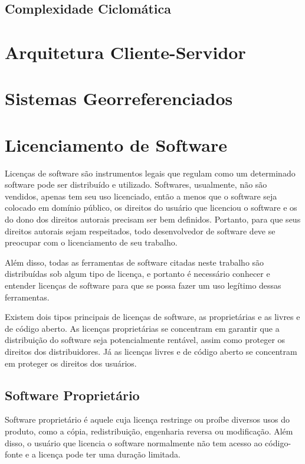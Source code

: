 \subsection{Complexidade Ciclomática}

\section{Arquitetura Cliente-Servidor}

\section{Sistemas Georreferenciados}

\section{Licenciamento de Software}

Licenças de software são instrumentos legais que regulam como um determinado software pode ser distribuído e utilizado.
Softwares, usualmente, não são vendidos, apenas tem seu uso licenciado, então a menos que o software seja colocado em domínio público, os direitos do usuário que licenciou o software e os do dono dos direitos autorais precisam ser bem definidos. Portanto, para que seus direitos autorais sejam respeitados, todo desenvolvedor de software deve se preocupar com o licenciamento de seu trabalho.

Além disso, todas as ferramentas de software citadas neste trabalho são distribuídas sob algum tipo de licença, e portanto é necessário conhecer e entender licenças de software para que se possa fazer um uso legítimo dessas ferramentas.

Existem dois tipos principais de licenças de software, as proprietárias e as livres e de código aberto. As licenças proprietárias se concentram em garantir que a distribuição do software seja potencialmente rentável, assim como proteger os direitos dos distribuidores. Já as licenças livres e de código aberto se concentram em proteger os direitos dos usuários.

\subsection{Software Proprietário} 

Software proprietário é aquele cuja licença restringe ou proíbe diversos usos do produto, como a cópia, redistribuição, engenharia reversa ou modificação. Além disso, o usuário que licencia o software normalmente não tem acesso ao código-fonte e a licença pode ter uma duração limitada.

